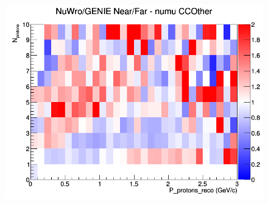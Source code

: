 \begin{figure}[h]
\endminipage
{}
\includegraphics[width=\linewidth]{eff_N_P/GAr/protons/ratios/CCOther_NuWro_GENIE_numu_NF_N_P.png}
\endminipage
\newline
\end{figure}
\clearpage
